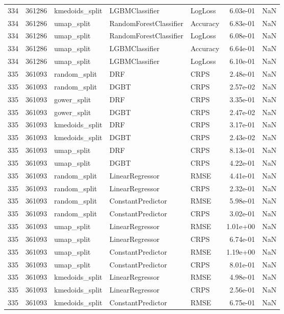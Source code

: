 \begin{tabular}{rrlllrr}
334 & 361286 & kmedoids\_split & LGBMClassifier & LogLoss & 6.03e-01 & NaN \\
334 & 361286 & umap\_split & RandomForestClassifier & Accuracy & 6.83e-01 & NaN \\
334 & 361286 & umap\_split & RandomForestClassifier & LogLoss & 6.08e-01 & NaN \\
334 & 361286 & umap\_split & LGBMClassifier & Accuracy & 6.64e-01 & NaN \\
334 & 361286 & umap\_split & LGBMClassifier & LogLoss & 6.10e-01 & NaN \\
335 & 361093 & random\_split & DRF & CRPS & 2.48e-01 & NaN \\
335 & 361093 & random\_split & DGBT & CRPS & 2.57e-02 & NaN \\
335 & 361093 & gower\_split & DRF & CRPS & 3.35e-01 & NaN \\
335 & 361093 & gower\_split & DGBT & CRPS & 2.47e-02 & NaN \\
335 & 361093 & kmedoids\_split & DRF & CRPS & 3.17e-01 & NaN \\
335 & 361093 & kmedoids\_split & DGBT & CRPS & 2.43e-02 & NaN \\
335 & 361093 & umap\_split & DRF & CRPS & 8.13e-01 & NaN \\
335 & 361093 & umap\_split & DGBT & CRPS & 4.22e-01 & NaN \\
335 & 361093 & random\_split & LinearRegressor & RMSE & 4.41e-01 & NaN \\
335 & 361093 & random\_split & LinearRegressor & CRPS & 2.32e-01 & NaN \\
335 & 361093 & random\_split & ConstantPredictor & RMSE & 5.98e-01 & NaN \\
335 & 361093 & random\_split & ConstantPredictor & CRPS & 3.02e-01 & NaN \\
335 & 361093 & umap\_split & LinearRegressor & RMSE & 1.01e+00 & NaN \\
335 & 361093 & umap\_split & LinearRegressor & CRPS & 6.74e-01 & NaN \\
335 & 361093 & umap\_split & ConstantPredictor & RMSE & 1.19e+00 & NaN \\
335 & 361093 & umap\_split & ConstantPredictor & CRPS & 8.01e-01 & NaN \\
335 & 361093 & kmedoids\_split & LinearRegressor & RMSE & 4.98e-01 & NaN \\
335 & 361093 & kmedoids\_split & LinearRegressor & CRPS & 2.56e-01 & NaN \\
335 & 361093 & kmedoids\_split & ConstantPredictor & RMSE & 6.75e-01 & NaN \\

\end{tabular}
